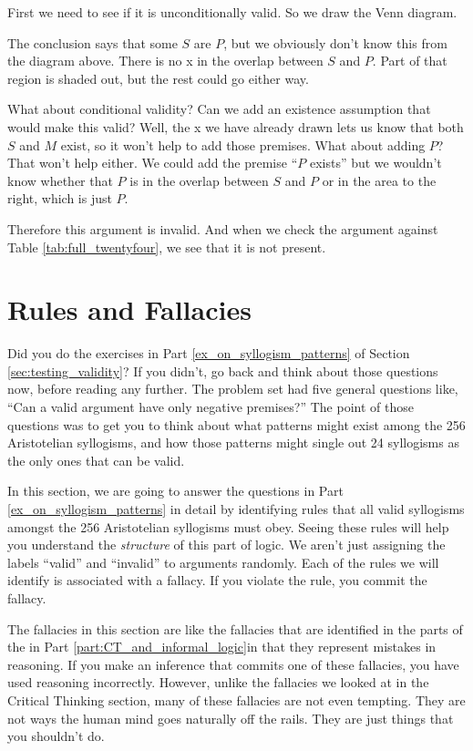 First we need to see if it is unconditionally valid. So we draw the Venn diagram.





The conclusion says that some $S$ are $P$, but we obviously don't know this from the diagram above. There is no x in the overlap between $S$ and $P$. Part of that region is shaded out, but the rest could go either way.

What about conditional validity? Can we add an existence assumption that would make this valid? Well, the x we have already drawn lets us know that both $S$ and $M$ exist, so it won't help to add those premises. What about adding $P$? That won't help either. We could add the premise ``$P$ exists'' but we wouldn't know whether that $P$ is in the overlap between $S$ and $P$ or in the area to the right, which is just $P$.

Therefore this argument is invalid. And when we check the argument against Table \ref{tab:full_twentyfour}, we see that it is not present.

\section{Rules and Fallacies}

\label{sec:rules_and_fallacies}
Did you do the exercises in Part \ref{ex_on_syllogism_patterns} of Section \ref{sec:testing_validity}? If you didn't, go back and think about those questions now, before reading any further. The problem set had five general questions like, ``Can a valid argument have only negative premises?'' The point of those questions was to get you to think about what patterns might exist among the 256 Aristotelian syllogisms, and how those patterns might single out 24 syllogisms as the only ones that can be valid.

In this section, we are going to answer the questions in Part \ref{ex_on_syllogism_patterns} in detail by identifying rules that all valid syllogisms amongst the 256 Aristotelian syllogisms must obey. Seeing these rules will help you understand the \emph{structure} of this part of logic. We aren't just  assigning the labels ``valid'' and ``invalid'' to arguments randomly. Each of the rules we will identify is associated with a fallacy. If you violate the rule, you commit the fallacy.

The fallacies in this section are like the fallacies that are identified in the parts of the in Part \ref{part:CT_and_informal_logic}in that they represent mistakes in reasoning. If you make an inference that commits one of these fallacies, you have used reasoning incorrectly. However, unlike the fallacies we looked at in the Critical Thinking section, many of these fallacies are not even tempting. They are not ways the human mind goes naturally off the rails. They are just things that you shouldn't do.

